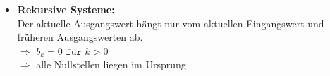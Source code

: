 \begin{mdframed}[style=exercise]
\begin{itemize}
{\begin{minipage}{0.6\textwidth}
			      \end{minipage}
		      }
		\item \textbf{Rekursive Systeme:}\\
		      Der aktuelle Ausgangswert hängt nur vom aktuellen Eingangswert
		      und früheren Ausgangswerten ab.\\
		      $\Rightarrow$ $b_k=0 \texttt{ für } k>0$\\
		      $\Rightarrow$ alle Nullstellen liegen im Ursprung

	\end{itemize}
\end{mdframed}

